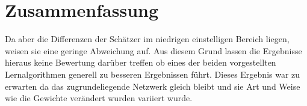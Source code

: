 

\section{Zusammenfassung} 

Da aber die Differenzen der Schätzer im niedrigen einstelligen Bereich liegen, weisen sie eine geringe Abweichung auf. Aus diesem Grund lassen die Ergebnisse hieraus keine Bewertung darüber treffen ob eines der beiden vorgestellten Lernalgorithmen generell zu besseren Ergebnissen führt. Dieses Ergebnis war zu erwarten da das zugrundeliegende Netzwerk gleich bleibt und sie Art und Weise wie die Gewichte verändert wurden variiert wurde. 